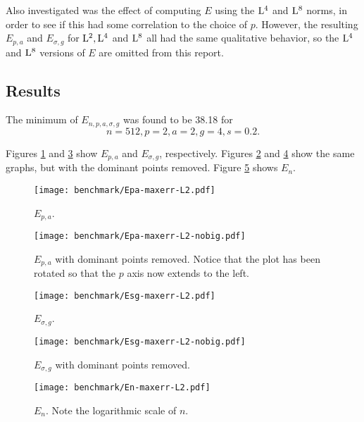 Also investigated was the effect of computing $E$ using the $\Lp[4]$
and $\Lp[8]$ norms, in order to see if this had some correlation to
the choice of $p$. However, the resulting $E_{p,a}$ and $E_{\sigma,g}$ for
$\Lp[2], \Lp[4]$ and $\Lp[8]$ all had the same qualitative behavior,
so the $\Lp[4]$ and $\Lp[8]$ versions of $E$ are omitted from this
report.

\subsection{Results}

The minimum of $E_{n,p,a,\sigma,g}$ was found to be 38.18 for
\begin{equation*}
  n=512, p=2, a=2, g=4, s=0.2.
\end{equation*}

Figures \ref{fig:Epa-maxerr-L2} and \ref{fig:Esg-maxerr-L2} show
$E_{p,a}$ and $E_{\sigma,g}$, respectively. Figures
\ref{fig:Epa-maxerr-L2-nobig} and \ref{fig:Esg-maxerr-L2-nobig} show
the same graphs, but with the dominant points removed. Figure
\ref{fig:En-maxerr-L2} shows $E_n$.

\begin{figure}[p]
  \centering
  \texttt{[image: benchmark/Epa-maxerr-L2.pdf]}
  \caption{$E_{p,a}$.}
  \label{fig:Epa-maxerr-L2}
\end{figure}

\begin{figure}[p]
  \centering
  \texttt{[image: benchmark/Epa-maxerr-L2-nobig.pdf]}
  \caption{$E_{p,a}$ with dominant points removed. Notice that the
    plot has been rotated so that the $p$ axis now extends to the
    left.}
  \label{fig:Epa-maxerr-L2-nobig}
\end{figure}

\begin{figure}[p]
  \centering
  \texttt{[image: benchmark/Esg-maxerr-L2.pdf]}
  \caption{$E_{\sigma,g}$.}
  \label{fig:Esg-maxerr-L2}
\end{figure}

\begin{figure}[p]
  \centering
  \texttt{[image: benchmark/Esg-maxerr-L2-nobig.pdf]}
  \caption{$E_{\sigma,g}$ with dominant points removed.}
  \label{fig:Esg-maxerr-L2-nobig}
\end{figure}

\begin{figure}[htb]
  \centering
  \texttt{[image: benchmark/En-maxerr-L2.pdf]}
  \caption{$E_n$. Note the logarithmic scale of $n$.}
  \label{fig:En-maxerr-L2}
\end{figure}


